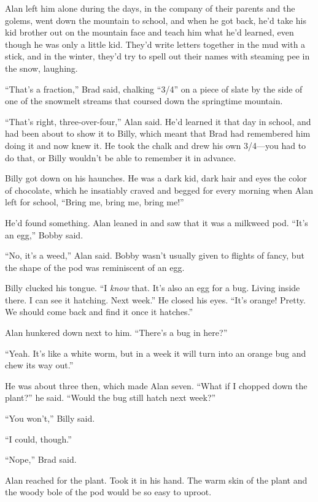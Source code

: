 Alan left him alone during the days, in the company of their parents
and the golems, went down the mountain to school, and when he got
back, he'd take his kid brother out on the mountain face and teach him
what he'd learned, even though he was only a little kid.  They'd write
letters together in the mud with a stick, and in the winter, they'd
try to spell out their names with steaming pee in the snow, laughing.

``That's a fraction,'' Brad said, chalking ``3/4'' on a piece of slate
by the side of one of the snowmelt streams that coursed down the
springtime mountain.

``That's right, three-over-four,'' Alan said.  He'd learned it that
day in school, and had been about to show it to Billy, which meant
that Brad had remembered him doing it and now knew it.  He took the
chalk and drew his own 3/4---you had to do that, or Billy wouldn't be
able to remember it in advance.

Billy got down on his haunches.  He was a dark kid, dark hair and eyes
the color of chocolate, which he insatiably craved and begged for
every morning when Alan left for school, ``Bring me, bring me, bring
me!''

He'd found something.  Alan leaned in and saw that it was a milkweed
pod.  ``It's an egg,'' Bobby said.

``No, it's a weed,'' Alan said.  Bobby wasn't usually given to flights
of fancy, but the shape of the pod was reminiscent of an egg.

Billy clucked his tongue.  ``I \textit{know} that.  It's also an egg
for a bug.  Living inside there.  I can see it hatching.  Next week.''
He closed his eyes.  ``It's orange!  Pretty.  We should come back and
find it once it hatches.''

Alan hunkered down next to him.  ``There's a bug in here?''

``Yeah.  It's like a white worm, but in a week it will turn into an
orange bug and chew its way out.''

He was about three then, which made Alan seven.  ``What if I chopped
down the plant?'' he said.  ``Would the bug still hatch next week?''

``You won't,'' Billy said.

``I could, though.''

``Nope,'' Brad said.

Alan reached for the plant.  Took it in his hand.  The warm skin of
the plant and the woody bole of the pod would be so easy to uproot.

